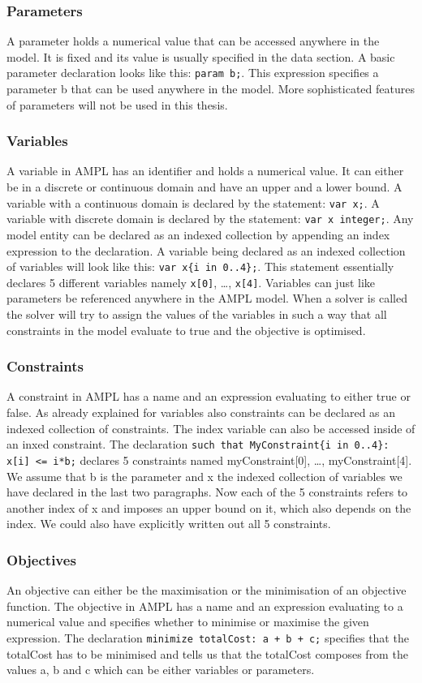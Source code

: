 \subsubsection{Parameters}
A parameter holds a numerical value that can be accessed anywhere in the model. It is fixed and its value is usually specified in the data section. A basic parameter declaration looks like this: \verb=param b;=. This expression specifies a parameter b that can be used anywhere in the model. More sophisticated features of parameters will not be used in this thesis.
\subsubsection{Variables}
A variable in AMPL has an identifier and holds a numerical value. It can either be in a discrete or continuous domain and have an upper and a lower bound. A variable with a continuous domain is declared by the statement: \verb=var x;=. A variable with discrete domain is declared by the statement: \verb=var x integer;=. Any model entity can be declared as an indexed collection by appending an index expression to the declaration. A variable being declared as an indexed collection of variables will look like this: \verb=var x{i in 0..4};=. This statement essentially declares 5 different variables namely \verb=x[0]=, \ldots , \verb=x[4]=. Variables can just like parameters be referenced anywhere in the AMPL model. When a solver is called the solver will try to assign the values of the variables in such a way that all constraints in the model evaluate to true and the objective is optimised.
\subsubsection{Constraints}
A constraint in AMPL has a name and an expression evaluating to either true or false. As already explained for variables also constraints can be declared as an indexed collection of constraints. The index variable can also be accessed inside of an inxed constraint. The declaration \verb&such that MyConstraint{i in 0..4}: x[i] <= i*b;& declares 5 constraints named myConstraint[0], \ldots, myConstraint[4]. We assume that b is the parameter and x the indexed collection of variables we have declared in the last two paragraphs. Now each of the 5 constraints refers to another index of x and imposes an upper bound on it, which also depends on the index. We could also have explicitly written out all 5 constraints.
\subsubsection{Objectives}
An objective can either be the maximisation or the minimisation of an objective function. The objective in AMPL has a name and an expression evaluating to a numerical value and specifies whether to minimise or maximise the given expression. The declaration \verb&minimize totalCost: a + b + c;& specifies that the totalCost has to be minimised and tells us that the totalCost composes from the values a, b and c which can be either variables or parameters. 

